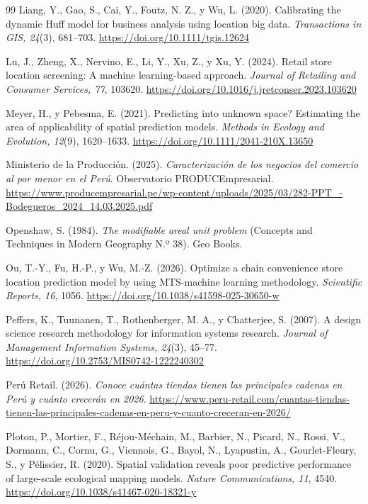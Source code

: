 \documentclass[10pt,letterpaper,twocolumn]{article}
\begin{document}
\begin{thebibliography}{99}
 Liang, Y., Gao, S., Cai, Y., Foutz, N. Z., y Wu, L. (2020). Calibrating the dynamic Huff model for business analysis using location big data. \textit{Transactions in GIS, 24}(3), 681--703. \url{https://doi.org/10.1111/tgis.12624}

 Lu, J., Zheng, X., Nervino, E., Li, Y., Xu, Z., y Xu, Y. (2024). Retail store location screening: A machine learning-based approach. \textit{Journal of Retailing and Consumer Services, 77}, 103620. \url{https://doi.org/10.1016/j.jretconser.2023.103620}

 Meyer, H., y Pebesma, E. (2021). Predicting into unknown space? Estimating the area of applicability of spatial prediction models. \textit{Methods in Ecology and Evolution, 12}(9), 1620--1633. \url{https://doi.org/10.1111/2041-210X.13650}

 Ministerio de la Producción. (2025). \textit{Caracterización de los negocios del comercio al por menor en el Perú}. Observatorio PRODUCEmpresarial. \url{https://www.producempresarial.pe/wp-content/uploads/2025/03/282-PPT_-Bodegueros_2024_14.03.2025.pdf}

 Openshaw, S. (1984). \textit{The modifiable areal unit problem} (Concepts and Techniques in Modern Geography N.º 38). Geo Books.

 Ou, T.-Y., Fu, H.-P., y Wu, M.-Z. (2026). Optimize a chain convenience store location prediction model by using MTS-machine learning methodology. \textit{Scientific Reports, 16}, 1056. \url{https://doi.org/10.1038/s41598-025-30650-w}

 Peffers, K., Tuunanen, T., Rothenberger, M. A., y Chatterjee, S. (2007). A design science research methodology for information systems research. \textit{Journal of Management Information Systems, 24}(3), 45--77. \url{https://doi.org/10.2753/MIS0742-1222240302}

 Perú Retail. (2026). \textit{Conoce cuántas tiendas tienen las principales cadenas en Perú y cuánto crecerán en 2026}. \url{https://www.peru-retail.com/cuantas-tiendas-tienen-las-principales-cadenas-en-peru-y-cuanto-creceran-en-2026/}

 Ploton, P., Mortier, F., Réjou-Méchain, M., Barbier, N., Picard, N., Rossi, V., Dormann, C., Cornu, G., Viennois, G., Bayol, N., Lyapustin, A., Gourlet-Fleury, S., y Pélissier, R. (2020). Spatial validation reveals poor predictive performance of large-scale ecological mapping models. \textit{Nature Communications, 11}, 4540. \url{https://doi.org/10.1038/s41467-020-18321-y}


\end{thebibliography}
\end{document}
